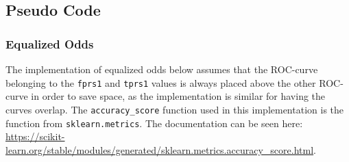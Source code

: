 \documentclass[11pt, fleqn, titlepage]{article}
\begin{document}
	\subsection{Pseudo Code}\label{pseudo_code}
	\subsubsection{Equalized Odds}\label{Pseudo Equalized}
	The implementation of equalized odds below assumes that the ROC-curve belonging to the \texttt{fprs1} and \texttt{tprs1} values is always placed above the other ROC-curve in order to save space, as the implementation is similar for having the curves overlap. The \texttt{accuracy\_score} function used in this implementation is the function from \texttt{sklearn.metrics}. The documentation can be seen here: \url{https://scikit-learn.org/stable/modules/generated/sklearn.metrics.accuracy_score.html}.
\end{document}
